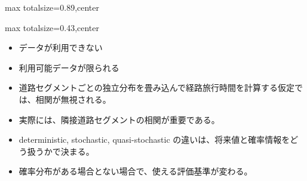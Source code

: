 \begin{minipage}[t]{0.58\textwidth}
\begin{adjustbox}{max totalsize={\textwidth}{0.89\textheight},center}
\begin{minipage}{\textwidth}
\end{minipage}
\end{adjustbox}
\end{minipage}


\clearpage
{}
\begin{minipage}[t]{0.405\textwidth}
\begin{adjustbox}{max totalsize={\textwidth}{0.43\textheight},center}
\begin{minipage}{\textwidth}\scriptsize
{}\begin{itemize}
\item データが利用できない
\item 利用可能データが限られる
\item 道路セグメントごとの独立分布を畳み込んで経路旅行時間を計算する仮定では、相関が無視される。
\item 実際には、隣接道路セグメントの相関が重要である。
\end{itemize}\begin{itemize}
\item deterministic, stochastic, quasi-stochastic の違いは、将来値と確率情報をどう扱うかで決まる。
\item 確率分布がある場合とない場合で、使える評価基準が変わる。
\end{itemize}
\end{minipage}
\end{adjustbox}
\end{minipage}\hfill
